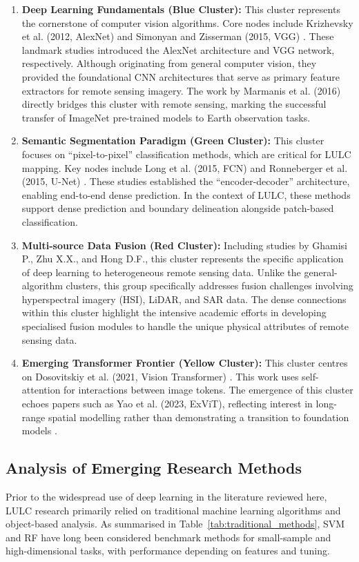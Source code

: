 \documentclass[]{interact}
\theoremstyle{plain}%
\theoremstyle{definition}
\theoremstyle{remark}
\begin{document}
\begin{enumerate}
	\item \textbf{Deep Learning Fundamentals (Blue Cluster):} This cluster represents the cornerstone of computer vision algorithms. Core nodes include Krizhevsky et al. (2012, AlexNet) and Simonyan and Zisserman (2015, VGG) \citep{31, 32}. These landmark studies introduced the AlexNet architecture and VGG network, respectively. Although originating from general computer vision, they provided the foundational CNN architectures that serve as primary feature extractors for remote sensing imagery. The work by Marmanis et al. (2016) directly bridges this cluster with remote sensing, marking the successful transfer of ImageNet pre-trained models to Earth observation tasks.
	
	\item \textbf{Semantic Segmentation Paradigm (Green Cluster):} This cluster focuses on ``pixel-to-pixel'' classification methods, which are critical for LULC mapping. Key nodes include Long et al. (2015, FCN) \citep{33} and Ronneberger et al. (2015, U-Net) \citep{34}. These studies established the ``encoder-decoder'' architecture, enabling end-to-end dense prediction. In the context of LULC, these methods support dense prediction and boundary delineation alongside patch-based classification.
	
	\item \textbf{Multi-source Data Fusion (Red Cluster):} Including studies by Ghamisi P., Zhu X.X., and Hong D.F., this cluster represents the specific application of deep learning to heterogeneous remote sensing data. Unlike the general-algorithm clusters, this group specifically addresses fusion challenges involving hyperspectral imagery (HSI), LiDAR, and SAR data. The dense connections within this cluster highlight the intensive academic efforts in developing specialised fusion modules to handle the unique physical attributes of remote sensing data.
	
	\item \textbf{Emerging Transformer Frontier (Yellow Cluster):} This cluster centres on Dosovitskiy et al. (2021, Vision Transformer) \citep{35}. This work uses self-attention for interactions between image tokens. The emergence of this cluster echoes papers such as Yao et al. (2023, ExViT), reflecting interest in long-range spatial modelling rather than demonstrating a transition to foundation models \citep{36}.
\end{enumerate}

\subsection{Analysis of Emerging Research Methods}
Prior to the widespread use of deep learning in the literature reviewed here, LULC research primarily relied on traditional machine learning algorithms and object-based analysis. As summarised in Table~\ref{tab:traditional_methods}, SVM and RF have long been considered benchmark methods for small-sample and high-dimensional tasks, with performance depending on features and tuning.
\end{document}
